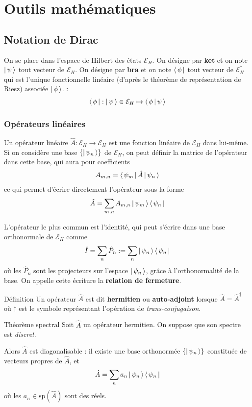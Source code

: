 \section{Outils mathématiques}

    \subsection{Notation de Dirac}

        On se place dans l’espace de Hilbert des états $\mathcal{E}_H$. On désigne par \textbf{ket} et on note $\left| \, \psi \, \right>$ tout vecteur de $\mathcal{E}_H$. On désigne par \textbf{bra} et on note $\left< \, \phi \, \right|$ tout vecteur de $\mathcal{E}_H^*$ qui est l’unique fonctionnelle linéaire (d’après le théorème de représentation de Riesz) associée $\left| \, \phi \, \right>$. :
        \[ \left< \, \phi \, \right| : \left| \, \psi \, \right> \in \mathcal{E}_H \mapsto \left< \, \phi \, \middle| \, \psi \, \right> \]

        \subsubsection{Opérateurs linéaires}

        Un opérateur linéaire $\hat{A} : \mathcal{E}_H \to \mathcal{E}_H$ est une fonction linéaire de $\mathcal{E}_H$ dans lui-même. Si on considère une base $\left\{\left| \, \psi_n \, \right>\right\}$ de $\mathcal{E}_H$, on peut définir la matrice de l’opérateur dans cette base, qui aura pour coefficients 
        \[ A_{m,n} = \left< \, \psi_m \, \right| \hat{A} \left| \, \psi_n \, \right> \]
        ce qui permet d’écrire directement l’opérateur sous la forme 
        \[ \hat{A} = \sum_{m,n} A_{m,n} \left| \, \psi_m \, \right> \left< \, \psi_n \, \right| \]  

        L’opérateur le plus commun est l’identité, qui peut s’écrire dans une base orthonormale de $\mathcal{E}_H$ comme 
        \[ \hat{I} = \sum_{n} \hat{P}_n := \sum_{n} \left| \, \psi_n \, \right> \left< \, \psi_n \, \right| \]   
        où les $\hat{P}_n$ sont les projecteurs sur l’espace $\left| \, \psi_n \, \right>$, grâce à l’orthonormalité de la base. On appelle cette écriture la \textbf{relation de fermeture}.

        \begin{omed}{Définition}
            Un opérateur $\hat{A}$ est dit \textbf{hermitien} ou \textbf{auto-adjoint} lorsque $\hat{A} = \hat{A}^{\dagger}$ où $\dagger$ est le symbole représentant l’opération de \textit{trans-conjugaison}.
        \end{omed}

        \begin{omed}{Théorème spectral}
            Soit $\hat{A}$ un opérateur hermitien. On suppose que son spectre est \textit{discret}. 

            Alors $\hat{A}$ est diagonalisable : il existe une base orthonormée $\left\{\left| \, \psi_n \, \right>\right\}$ constituée de vecteurs propres de $\hat{A}$, et 
            \[ \hat{A} = \sum_n a_n \left| \, \psi_n \, \right> \left< \, \psi_n \, \right| \]   
            où les $a_n \in \text{sp}(\hat{A})$ sont des réels.
        \end{omed}

